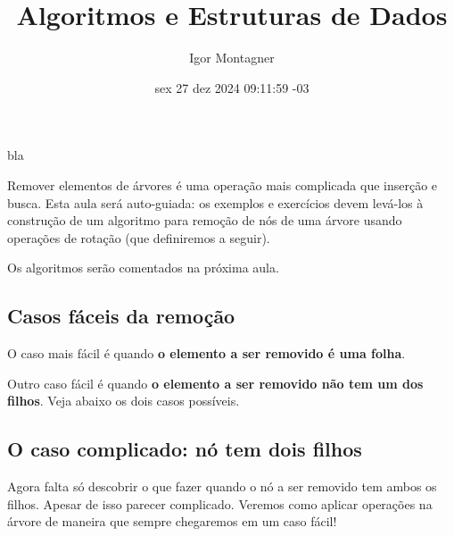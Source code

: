 \documentclass[]{article}
\title{Algoritmos e Estruturas de Dados}
\author{Igor Montagner}
\date{sex 27 dez 2024 09:11:59 -03}
\begin{document}
\setlength{\textfloatsep}{0pt}
\setlength{\intextsep}{0pt}
\setlength{\floatsep}{0pt}

bla

\maketitle





\begin{adjustwidth}{0pt}{10em}
Remover elementos de árvores é uma operação mais complicada que inserção
e busca. Esta aula será auto-guiada: os exemplos e exercícios devem
levá-los à construção de um algoritmo para remoção de nós de uma árvore
usando operações de rotação (que definiremos a seguir).

Os algoritmos serão comentados na próxima aula.

\subsection{Casos fáceis da
remoção}\label{casos-fuxe1ceis-da-remouxe7uxe3o}

O caso mais fácil é quando \textbf{o elemento a ser removido é uma
folha}.

\hfill{}

Outro caso fácil é quando \textbf{o elemento a ser removido não tem um
dos filhos}. Veja abaixo os dois casos possíveis.

\hfill{}

\hfill{}

\subsection{O caso complicado: nó tem dois
filhos}\label{o-caso-complicado-nuxf3-tem-dois-filhos}

Agora falta só descobrir o que fazer quando o nó a ser removido tem
ambos os filhos. Apesar de isso parecer complicado. Veremos como aplicar
operações na árvore de maneira que sempre chegaremos em um caso fácil!


\end{adjustwidth}
\end{document}
